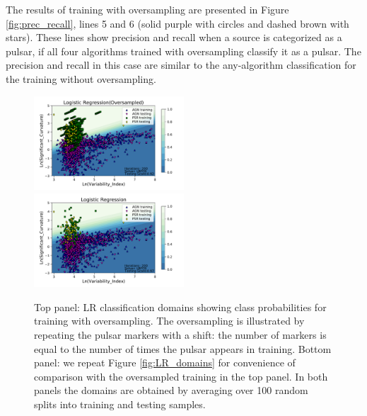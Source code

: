 The results of training with oversampling are presented  in Figure \ref{fig:prec_recall},
lines 5 and 6 (solid purple with circles and dashed brown with stars). 
These lines show precision and recall when a source is categorized as a pulsar, if all four algorithms trained with oversampling classify it as a pulsar. 
The precision and recall in this case are similar to the any-algorithm classification for the training without oversampling.


\begin{figure}[h]
\includegraphics[width=0.5\textwidth]{plots/classification_domains/lr_200_lbfgs_oversample.pdf}
\includegraphics[width=0.5\textwidth]{plots/classification_domains/lr_200_lbfgs.pdf}
\caption{Top panel: LR classification domains showing class probabilities for training with oversampling.
The oversampling is illustrated by repeating the pulsar markers with a shift: the number of markers is equal to the number of times the pulsar appears in training.
Bottom panel: we repeat Figure \ref{fig:LR_domains} for convenience of comparison with the oversampled training in the top panel.
In both panels the domains are obtained by averaging over 100 random splits into training and testing samples.
}  
\label{fig:LR_domains_O}
\end{figure}
